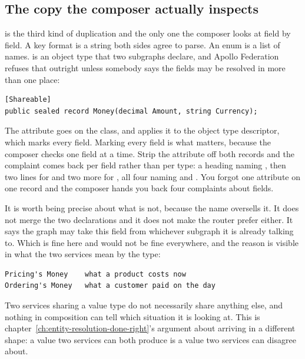 \subsection*{The copy the composer actually inspects}

%
 is the third kind of duplication and the only one the composer
looks at field by field. A key format is a string both sides agree to parse. An
enum is a list of names.  is an object type that two subgraphs
declare, and Apollo Federation refuses that outright unless somebody says the
fields may be resolved in more than one place:

\begin{verbatim}
[Shareable]
public sealed record Money(decimal Amount, string Currency);
\end{verbatim}

The attribute goes on the class, and 
applies it to the object type descriptor, which marks every field. Marking every
field is what matters, because the composer checks one field at a time. Strip
the attribute off both records and the complaint comes back per field rather
than per type: a heading naming , then two lines for 
and two more for , all four naming  and
. You forgot one attribute on one record and the composer hands
you back four complaints about fields.

%
It is worth being precise about what  is not, because the name
oversells it. It does not merge the two declarations and it does not make the
router prefer either. It says the graph may take this field from whichever
subgraph it is already talking to. Which is fine here and would not be fine
everywhere, and the reason is visible in what the two services mean by the type:

\begin{verbatim}
Pricing's Money    what a product costs now
Ordering's Money   what a customer paid on the day
\end{verbatim}

Two services sharing a value type do not necessarily share anything else, and
nothing in composition can tell which situation it is looking at. This is
chapter~\ref{ch:entity-resolution-done-right}'s argument about 
arriving in a different shape: a value two services can both produce is a value
two services can disagree about.

